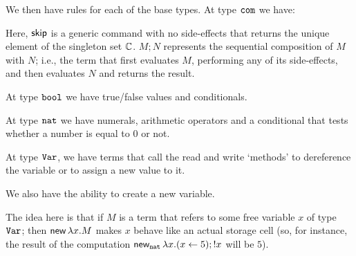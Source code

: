\documentclass[11pt]{report}
\begin{document}
We then have rules for each of the base types.  
At type $\com$ we have:
Here, $\skipp$ is a generic command with no side-effects that returns the unique element of the singleton set $\bC$.  
$M;N$ represents the sequential composition of $M$ with $N$; i.e., the term that first evaluates $M$, performing any of its side-effects, and then evaluates $N$ and returns the result.

At type $\bool$ we have true/false values and conditionals.

At type $\nat$ we have numerals, arithmetic operators and a conditional that tests whether a number is equal to $0$ or not.

At type $\Var$, we have terms that call the read and write `methods' to dereference the variable or to assign a new value to it.

We also have the ability to create a new variable.
\begin{mathpar}
\end{mathpar}
The idea here is that if $M$ is a term that refers to some free variable $x$ of type $\Var$; then $\neww \lambda x.M$ makes $x$ behave like an actual storage cell (so, for instance, the result of the computation $\neww_\nat \lambda x.(x\gets 5);!x$ will be $5$).
\end{document}
